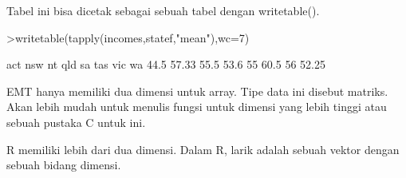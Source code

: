 \documentclass[a4paper,10pt]{article}
\begin{document}
\begin{eulernotebook}
\begin{eulercomment}
\begin{eulercomment}
\begin{eulercomment}
\begin{eulercomment}
\begin{eulercomment}
Tabel ini bisa dicetak sebagai sebuah tabel dengan writetable().
\end{eulercomment}
\begin{eulerprompt}
>writetable(tapply(incomes,statef,"mean"),wc=7)
\end{eulerprompt}
\begin{euleroutput}
      act    nsw     nt    qld     sa    tas    vic     wa
     44.5  57.33   55.5   53.6     55   60.5     56  52.25
\end{euleroutput}
\begin{eulercomment}
EMT hanya memiliki dua dimensi untuk array. Tipe data ini disebut
matriks. Akan lebih mudah untuk menulis fungsi untuk dimensi yang
lebih tinggi atau sebuah pustaka C untuk ini.

R memiliki lebih dari dua dimensi. Dalam R, larik adalah sebuah vektor
dengan sebuah bidang dimensi.


\end{eulercomment}
\end{eulercomment}
\end{eulercomment}
\end{eulercomment}
\end{eulercomment}
\end{eulernotebook}
\end{document}
